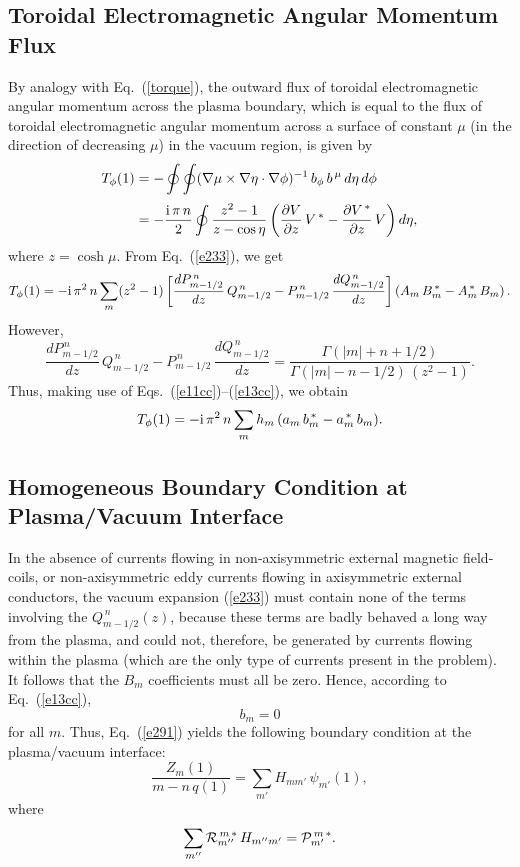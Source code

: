 \documentclass[12pt,prb,aps]{revtex4-1}
\begin{document}
\subsection{Toroidal Electromagnetic Angular Momentum Flux}
By analogy with Eq.~(\ref{torque}), the outward flux of toroidal electromagnetic angular momentum across the plasma boundary,
which is equal to the flux of  toroidal electromagnetic angular momentum across a surface of constant $\mu$ (in the direction of
decreasing $\mu$) in the vacuum region, is given by 
\begin{align}
T_\phi(1) &= -\oint\oint (\nabla\mu\times \nabla\eta\cdot\nabla\phi)^{-1}\,b_\phi\,b^{\,\mu}\,d\eta\,d\phi\nonumber\\[0.5ex]
&= -\frac{{\rm i}\,\pi\,n}{2}\oint \frac{z^2-1}{z-\cos\eta}\left(\frac{\partial V}{\partial z}\,V^{\,\ast}-\frac{\partial V^{\,\ast}}{\partial z}\,V\right)d\eta,
\end{align}
where $z=\cosh\mu$. 
From Eq.~(\ref{e233}), we get
\begin{equation}
T_\phi(1)=-{\rm i}\,\pi^2\,n\sum_m(z^2-1)\left[\frac{dP_{m-1/2}^{\,n}}{dz}\,Q_{m-1/2}^{\,n}- P_{m-1/2}^{\,n}\,\frac{dQ_{m-1/2}^{\,n}}{dz}\right]
\left(A_m\,B_m^{\,\ast}- A_m^{\,\ast}\,B_m\right).
\end{equation}
However,\cite{morse3}
\begin{equation}
\frac{dP_{m-1/2}^{\,n}}{dz}\,Q_{m-1/2}^{\,n}- P_{m-1/2}^{\,n}\,\frac{dQ_{m-1/2}^{\,n}}{dz}= \frac{\Gamma(|m|+n+1/2)}{\Gamma(|m|-n-1/2)\,(z^2-1)}.
\end{equation}
Thus, making use of Eqs.~(\ref{e11cc})--(\ref{e13cc}), we obtain
\begin{equation}\label{e90cc}
T_\phi(1) =- {\rm i}\,\pi^2\,n\sum_m h_m\,(a_m\,b_m^{\,\ast}-a_m^{\,\ast}\,b_m).
\end{equation}

\subsection{Homogeneous Boundary Condition at Plasma/Vacuum Interface}
In the absence of currents flowing in non-axisymmetric external magnetic field-coils, or  non-axisymmetric eddy currents flowing in axisymmetric external conductors, the vacuum expansion  (\ref{e233})
must contain none of the terms involving the $Q_{m-1/2}^{\,n}(z)$, because these terms are badly behaved a long way from the plasma,
and could not, therefore, be generated by currents flowing within the plasma (which are the only type of currents present in the problem).  It follows that the $B_m$ coefficients must all be zero. Hence, according to
Eq.~(\ref{e13cc}),
\begin{equation}\label{e296}
b_m= 0
\end{equation}
for all $m$. Thus, Eq.~(\ref{e291}) yields the following boundary condition at the plasma/vacuum interface:
\begin{equation}\label{e297}
\frac{Z_m(1) }{m-n\,q(1)}= \sum_{m'}H_{mm'}\,\psi_{m'}(1),
\end{equation}
where
\begin{equation}\label{e298}
\sum_{m''}{\cal R}_{m''}^{\,m\,\ast}\,H_{m'' m'}= {\cal P}_{m'}^{\,m\,\ast}.
\end{equation}
\end{document}
